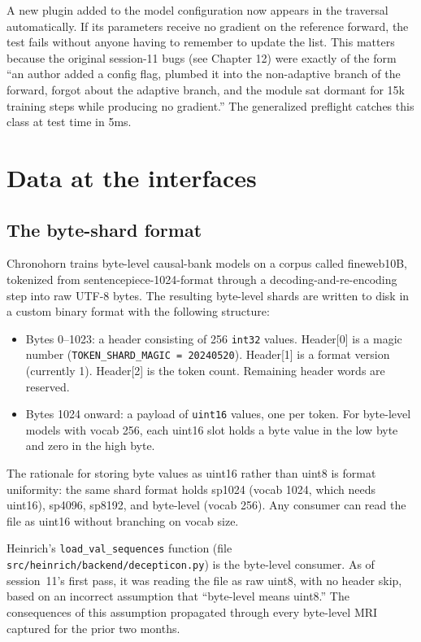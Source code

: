 \documentclass[11pt,openany]{book}
\begin{document}
A new plugin added to the model configuration now appears in the
traversal automatically. If its parameters receive no gradient on the
reference forward, the test fails without anyone having to remember
to update the list. This matters because the original
session-11 bugs (see Chapter 12) were exactly of the form ``an author
added a config flag, plumbed it into the non-adaptive branch of the
forward, forgot about the adaptive branch, and the module sat dormant
for 15k training steps while producing no gradient.'' The
generalized preflight catches this class at test time in 5ms.

\chapter{Data at the interfaces}
\label{chap:data}

\section{The byte-shard format}

Chronohorn trains byte-level causal-bank models on a corpus called
fineweb10B, tokenized from sentencepiece-1024-format through a
decoding-and-re-encoding step into raw UTF-8 bytes. The resulting
byte-level shards are written to disk in a custom binary format with
the following structure:

\begin{itemize}
  \item Bytes 0--1023: a header consisting of 256 \texttt{int32}
  values. Header[0] is a magic number (\texttt{TOKEN\_SHARD\_MAGIC =
  20240520}). Header[1] is a format version (currently 1). Header[2]
  is the token count. Remaining header words are reserved.
  \item Bytes 1024 onward: a payload of \texttt{uint16} values, one
  per token. For byte-level models with vocab 256, each uint16 slot
  holds a byte value in the low byte and zero in the high byte.
\end{itemize}

The rationale for storing byte values as uint16 rather than uint8 is
format uniformity: the same shard format holds sp1024 (vocab 1024,
which needs uint16), sp4096, sp8192, and byte-level (vocab 256). Any
consumer can read the file as uint16 without branching on vocab size.

Heinrich's \texttt{load\_val\_sequences} function (file
\texttt{src/heinrich/backend/decepticon.py}) is the byte-level
consumer. As of session~11's first pass, it was reading the file as
raw uint8, with no header skip, based on an incorrect assumption that
``byte-level means uint8.'' The consequences of this assumption
propagated through every byte-level MRI captured for the prior two
months.
\end{document}
